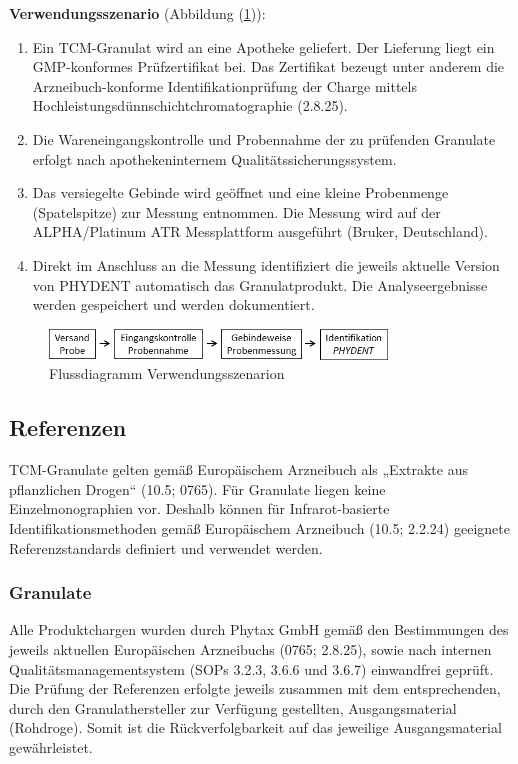 \documentclass[11pt, a4paper]{article}
\newcommand\VersionPhEur{10.5}
\begin{document}
\textbf{Verwendungsszenario} (Abbildung (\ref{fig:Flussdiagram})):
\begin{enumerate}
\item Ein TCM-Granulat wird an eine Apotheke geliefert. Der Lieferung liegt ein GMP-konformes Prüfzertifikat bei. Das Zertifikat bezeugt unter anderem die Arzneibuch-konforme Identifikationprüfung der Charge mittels Hochleistungsdünnschichtchromatographie (2.8.25).
\item Die Wareneingangskontrolle und Probennahme der zu prüfenden Granulate erfolgt nach apothekeninternem Qualitätssicherungssystem.
\item Das versiegelte Gebinde wird geöffnet und eine kleine Probenmenge (Spatelspitze) zur Messung entnommen. Die Messung wird auf der ALPHA/Platinum ATR Messplattform ausgeführt (Bruker, Deutschland).
\item Direkt im Anschluss an die Messung identifiziert die jeweils aktuelle Version von PHYDENT automatisch das Granulatprodukt. Die Analyseergebnisse werden gespeichert und werden dokumentiert.
\end{enumerate}

\begin{figure}
\centering
\includegraphics[width=0.8\textwidth]{flussdiagram.png}
\caption{Flussdiagramm Verwendungsszenarion}
\label{fig:Flussdiagram}
\end{figure}

\subsection{Referenzen}
TCM-Granulate gelten gemäß Europäischem Arzneibuch als „Extrakte aus pflanzlichen Drogen“ (\VersionPhEur; 0765). Für Granulate liegen keine Einzelmonographien vor. Deshalb können für Infrarot-basierte Identifikationsmethoden gemäß Europäischem Arzneibuch (\VersionPhEur; 2.2.24) geeignete Referenzstandards definiert und verwendet werden.

\subsubsection{Granulate}
Alle Produktchargen wurden durch Phytax GmbH gemäß den Bestimmungen des jeweils aktuellen Europäischen Arzneibuchs (0765; 2.8.25), sowie nach internen Qualitätsmanagementsystem (SOPs 3.2.3, 3.6.6 und 3.6.7) einwandfrei geprüft. Die Prüfung der Referenzen erfolgte jeweils zusammen mit dem entsprechenden, durch den Granulathersteller zur Verfügung gestellten, Ausgangsmaterial (Rohdroge). Somit ist die Rückverfolgbarkeit auf das jeweilige Ausgangsmaterial gewährleistet.
\end{document}
